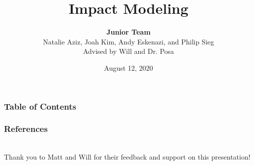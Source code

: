 \documentclass{beamer}
\title{Impact Modeling}
\author[me]{\textbf{Junior Team}\\ \footnotesize{Natalie Aziz, Joah Kim, Andy Eskenazi, and Philip Sieg\\} \small{Advised by Will and Dr. Posa}}
\institute{School of Engineering and Applied Science\\University of Pennsylvania}
\date{August 12, 2020}
\begin{document}
\frame{\titlepage}



\begin{frame}
    \frametitle{Table of Contents}
    \begin{minipage}{\textwidth}
        \tableofcontents
    \end{minipage}
\end{frame}













\begin{frame}
\frametitle{References}
    \tiny
    
    
    \small
    \\
    Thank you to Matt and Will for their feedback and support on this presentation!
\end{frame}
\end{document}
